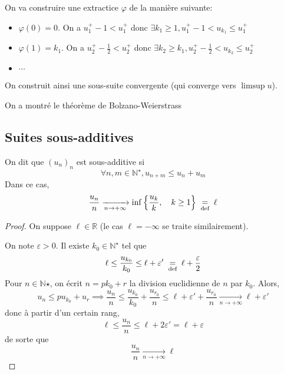 On va construire une extractice $\varphi$ de la manière suivante: \begin{itemize}
    \item $\varphi(0)=0$. On a $u_1^+-1<u_1^+$ donc $\exists k_1\geq 1, u_1^+-1<u_{k_1}\leq u_1^+$
    \item $\varphi(1)=k_1$. On a $u_2^+-\frac12<u_2^+$ donc $\exists k_2\geq k_1, u_2^+-\frac12<u_{k_2}\leq u_2^+$
    \item $\cdots$
\end{itemize}
On construit ainsi une sous-suite convergente (qui converge vers $\limsup u$).

\begin{rem}
    On a montré le théorème de Bolzano-Weierstrass
\end{rem}

\needspace{5cm}
\subsection{Suites sous-additives}

\begin{res}
    On dit que $(u_n)_n$ est sous-additive si \[
        \forall n, m\in\mathbb N^\star, u_{n+m}\leq u_n+u_m
    \]
    Dans ce cas, \[
        \frac{u_n}n\xrightarrow[n\to+\infty]{}\inf\left\{\frac{u_k}k, \quad k\geq 1\right\}\;\underset{\text{def}}=\;\ell
    \]
\end{res}

\begin{proof}
    On suppose $\ell\in\mathbb R$ (le cas $\ell=-\infty$ se traite similairement).

    On note $\varepsilon>0$. Il existe $k_0\in\mathbb N^\star$ tel que \[
        \ell\leq \frac{u_{k_0}}{k_0}\leq \ell+\varepsilon'\;\underset{\text{def}}=\;\ell+\frac\varepsilon2
    \]
    Pour $n\in\mathbb N$$\star$, on écrit $n=pk_0+r$ la division euclidienne de $n$ par $k_0$. Alors, \[
        u_n\leq pu_{k_0}+u_r\implies \frac{u_n}n\leq \frac{u_{k_0}}{k_0}+\frac{u_{r_0}}n\leq \ell+\varepsilon'+\frac{u_{r_0}}n\xrightarrow[n\to+\infty]{}\ell+\varepsilon'
    \]
    donc à partir d'un certain rang, \[
        \ell\leq \frac{u_n}n\leq \ell+2\varepsilon'=\ell+\varepsilon
    \]
    de sorte que \[
        \frac{u_n}n\xrightarrow[n\to+\infty]{}\ell
    \]
\end{proof}

